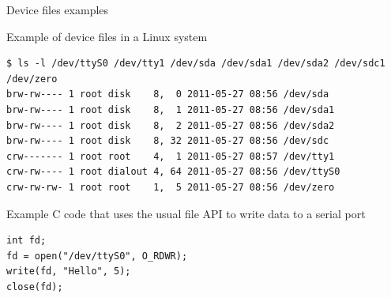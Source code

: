 \begin{frame}[fragile]{Device files examples}

Example of device files in a Linux system

\small
\begin{verbatim}
$ ls -l /dev/ttyS0 /dev/tty1 /dev/sda /dev/sda1 /dev/sda2 /dev/sdc1 /dev/zero
brw-rw---- 1 root disk    8,  0 2011-05-27 08:56 /dev/sda
brw-rw---- 1 root disk    8,  1 2011-05-27 08:56 /dev/sda1
brw-rw---- 1 root disk    8,  2 2011-05-27 08:56 /dev/sda2
brw-rw---- 1 root disk    8, 32 2011-05-27 08:56 /dev/sdc
crw------- 1 root root    4,  1 2011-05-27 08:57 /dev/tty1
crw-rw---- 1 root dialout 4, 64 2011-05-27 08:56 /dev/ttyS0
crw-rw-rw- 1 root root    1,  5 2011-05-27 08:56 /dev/zero
\end{verbatim}
\normalsize

Example C code that uses the usual file API to write data to a serial port

\small
\begin{verbatim}
int fd;
fd = open("/dev/ttyS0", O_RDWR);
write(fd, "Hello", 5);
close(fd);
\end{verbatim}
\end{frame}


